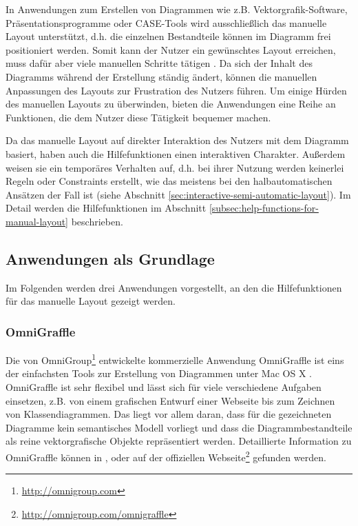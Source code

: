 In Anwendungen zum Erstellen von Diagrammen wie z.B. Vektorgrafik-Software, Präsentationsprogramme oder CASE-Tools wird ausschließlich das manuelle Layout unterstützt, d.h. die einzelnen Bestandteile können im Diagramm frei positioniert werden. Somit kann der Nutzer ein gewünschtes Layout erreichen, muss dafür aber viele manuellen Schritte tätigen \cite{Eichelberger05Aesthetics}. Da sich der Inhalt des Diagramms während der Erstellung ständig ändert, können die manuellen Anpassungen des Layouts zur Frustration des Nutzers führen. Um einige Hürden des manuellen Layouts zu überwinden, bieten die Anwendungen eine Reihe an Funktionen, die dem Nutzer diese Tätigkeit bequemer machen.

Da das manuelle Layout auf direkter Interaktion des Nutzers mit dem Diagramm basiert, haben auch die Hilfefunktionen einen interaktiven Charakter. Außerdem weisen sie ein temporäres Verhalten auf, d.h. bei ihrer Nutzung werden keinerlei Regeln oder Constraints erstellt, wie das meistens bei den halbautomatischen Ansätzen der Fall ist (siehe Abschnitt \ref{sec:interactive-semi-automatic-layout}). Im Detail werden die Hilfefunktionen im Abschnitt \ref{subsec:help-functions-for-manual-layout} beschrieben.

\subsection{Anwendungen als Grundlage}
\label{subsec:applications-for-manual-layout}

Im Folgenden werden drei Anwendungen vorgestellt, an den die Hilfefunktionen für das manuelle Layout gezeigt werden.

\subsubsection{OmniGraffle}
\label{subsubsec:omnigraffle}

Die von OmniGroup\footnote{\url{http://omnigroup.com}} entwickelte kommerzielle Anwendung OmniGraffle ist eins der einfachsten Tools zur Erstellung von Diagrammen unter Mac OS X \cite{Olsen10OmniGraffle}. OmniGraffle ist sehr flexibel und lässt sich für viele verschiedene Aufgaben einsetzen, z.B. von einem grafischen Entwurf einer Webseite bis zum Zeichnen von Klassendiagrammen. Das liegt vor allem daran, dass für die gezeichneten Diagramme kein semantisches Modell vorliegt und dass die Diagrammbestandteile als reine vektorgrafische Objekte repräsentiert werden. Detaillierte Information zu OmniGraffle können in \cite{08OmniGraffle}, \cite{Olsen10OmniGraffle} oder auf der offiziellen Webseite\footnote{\url{http://omnigroup.com/omnigraffle}} gefunden werden.

